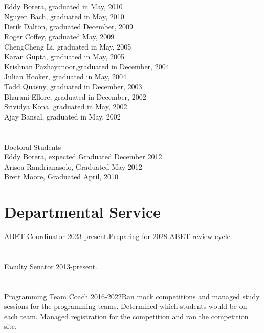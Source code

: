 \documentclass[12pt,letter]{resume}
\begin{document}
  \section{}{}{Eddy Borera, graduated in  May, 2010\\
Nguyen Bach, graduated in  May, 2010\\
  Derik Dalton, graduated December, 2009\\
  Roger Coffey, graduated May, 2009\\
  ChengCheng Li, graduated in May, 2005\\
  Karan Gupta, graduated in May, 2005\\
  Krishnan Pazhayanoor,graduated in December, 2004\\
  Julian Hooker, graduated in May, 2004\\
  Todd Quasny, graduated in December, 2003\\
  Bharani Ellore, graduated in December, 2002\\
  Srividya Kona, graduated in May, 2002\\
  Ajay Bansal, graduated in May, 2002\\
}

\section{}{Doctoral Students}
{
  \\Eddy Borera, expected Graduated December 2012\\
  Arisoa Randrianasolo, Graduated May 2012\\
  Brett Moore, Graduated April, 2010\\
 }


\section{Departmental Service}{ABET Coordinator 2023-present.}{Preparing for 2028 ABET review cycle.}

\vspace*{-1.25\baselineskip}
\section{}{Faculty Senator 2013-present.}{}

\vspace*{-1.25\baselineskip}
\section{}{Programming Team Coach 2016-2022}{Ran mock competitions and managed study sessions for the programming teams. Determined which students would be on each team.  Managed registration for the competition and ran the competition site.}
\end{document}
